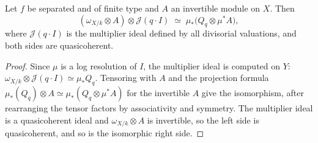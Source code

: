 \begin{lemma}
\label{lem:kn-relative-nadel-twisted-multiplier}
\leanok
Let $f$ be separated and of finite type and $A$ an invertible module on $X$.
Then
\[
 (\omega_{X/k}\otimes A)\otimes\mathcal J(q\cdot I)\;\simeq\;
 \mu_*\bigl(Q_q\otimes\mu^*A\bigr),
\]
where $\mathcal J(q\cdot I)$ is the multiplier ideal defined by all divisorial
valuations, and both sides are quasicoherent.
\end{lemma}
\begin{proof}
Since $\mu$ is a log resolution of $I$, the multiplier ideal is computed on
$Y$: $\omega_{X/k}\otimes\mathcal J(q\cdot I)\simeq\mu_*Q_q$. Tensoring with
$A$ and the projection formula $\mu_*(Q_q)\otimes A\simeq\mu_*(Q_q\otimes\mu^*A)$
for the invertible $A$ give the isomorphism, after rearranging the tensor
factors by associativity and symmetry. The multiplier ideal is a quasicoherent
ideal and $\omega_{X/k}\otimes A$ is invertible, so the left side is
quasicoherent, and so is the isomorphic right side.
\end{proof}

